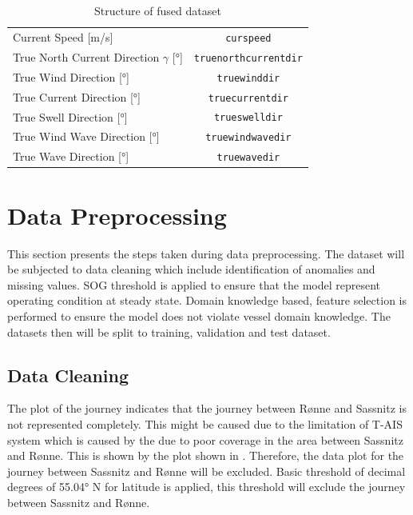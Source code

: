 \begin{table}[h!]
{\begin{tabular}{ p{} c }
    Current Speed [m/s] & {\tt curspeed} \\
    True North Current Direction $\gamma$ [°] & {\tt truenorthcurrentdir}\\
    True Wind Direction [°] & {\tt truewinddir}  \\
    True Current Direction [°] & {\tt truecurrentdir} \\
    True Swell Direction [°] & {\tt trueswelldir} \\
    True Wind Wave Direction [°] & {\tt truewindwavedir} \\
    True Wave Direction [°] & {\tt truewavedir} \\
    \end{tabular}}
\caption{Structure of fused dataset}\label{tbl:dataset_init_struct}
\end{table}

\section{Data Preprocessing}\label{sec:data_prep}

This section presents the steps taken during data preprocessing. The dataset will be subjected to data cleaning which include identification of anomalies and missing values. SOG threshold is applied to ensure that the model represent operating condition at steady state. Domain knowledge based, feature selection is performed to ensure the model does not violate vessel domain knowledge. The datasets then will be split to training, validation and test dataset. 

\subsection{Data Cleaning}\label{sec:data_cleaning}

The plot of the journey indicates that the journey between R{\o}nne and Sassnitz is not represented completely. This might be caused due to the limitation of T-AIS system which is caused by the due to poor coverage in the area between Sassnitz and R{\o}nne. This is shown by the plot shown in . Therefore, the data plot for the journey between Sassnitz and R{\o}nne will be excluded. Basic threshold of decimal degrees of 55.04° N for latitude is applied, this threshold will exclude the journey between Sassnitz and R{\o}nne.\\

